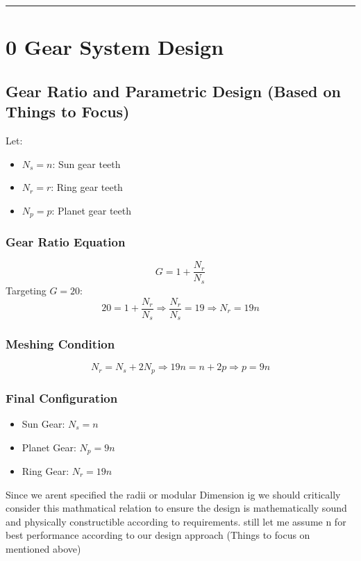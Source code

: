\documentclass[a4paper,12pt]{article}
\begin{document}
\vspace{1em}
\noindent\rule{\linewidth}{0.6pt}
\vspace{1em}

\section*{0   Gear System Design} \label{sec:gear}

\subsection*{Gear Ratio and Parametric Design (Based on Things to Focus)}

Let:
\begin{itemize}
    \item \( N_s = n \): Sun gear teeth
    \item \( N_r = r \): Ring gear teeth
    \item \( N_p = p \): Planet gear teeth
\end{itemize}

\subsubsection*{Gear Ratio Equation}
\[
G = 1 + \frac{N_r}{N_s}
\]
Targeting \( G = 20 \):
\[
20 = 1 + \frac{N_r}{N_s} \Rightarrow \frac{N_r}{N_s} = 19 \Rightarrow N_r = 19n
\]

\subsubsection*{Meshing Condition}
\[
N_r = N_s + 2N_p \Rightarrow 19n = n + 2p \Rightarrow p = 9n
\]

\subsubsection*{Final Configuration}
\begin{itemize}
    \item Sun Gear: \( N_s = n \)
    \item Planet Gear: \( N_p = 9n \)
    \item Ring Gear: \( N_r = 19n \)

\end{itemize}

Since we arent specified the radii or modular Dimension  ig we should critically consider this mathmatical relation to ensure the design is mathematically sound and physically constructible according to requirements. still let me assume n for best performance according to our design approach (Things to focus on mentioned above)
\end{document}
